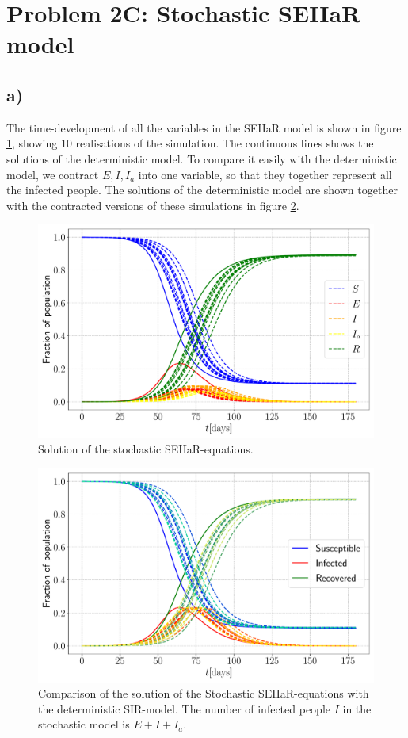\section{Problem 2C: Stochastic SEIIaR model}

\subsection{a)}

The time-development of all the variables in the SEIIaR model is shown in figure \ref{fig:SEIIaR}, showing $10$ realisations of the simulation. The continuous lines shows the solutions of the deterministic model. To compare it easily with the deterministic model, we contract $E,I,I_a$ into one variable, so that they together represent all the infected people. The solutions of the deterministic model are shown together with the contracted versions of these simulations in figure \ref{fig:SEIIaR_compare}. 

\begin{figure}[htb]
	\centering
	\includegraphics[width=0.8\columnwidth]{../fig/2Ca_SEIIaR.pdf}
	\caption{Solution of the stochastic SEIIaR-equations.}
	\label{fig:SEIIaR}
\end{figure}

\begin{figure}[htb]
	\centering
	\includegraphics[width=0.8\columnwidth]{../fig/2Ca_comp.pdf}
	\caption{Comparison of the solution of the Stochastic SEIIaR-equations with the deterministic SIR-model. The number of infected people $I$ in the stochastic model is $E + I + I_a$.}
	\label{fig:SEIIaR_compare}
\end{figure}

